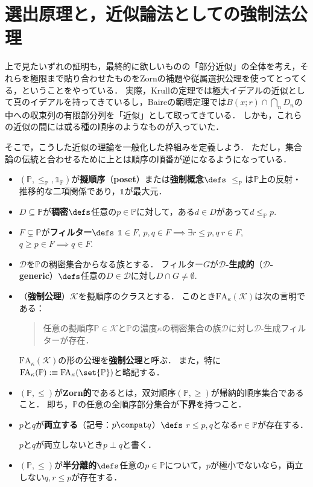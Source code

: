 \documentclass[a4j,leqno]{ltjsarticle}
\newcommand{\FA}{\mathrm{FA}}
\renewcommand{\emph}[1]{\textbf{\textsf{#1}}}
\begin{document}
\section{選出原理と，近似論法としての強制法公理}
上で見たいずれの証明も，最終的に欲しいものの「部分近似」の全体を考え，それらを極限まで貼り合わせたものをZornの補題や従属選択公理を使ってとってくる，ということをやっている．
実際，Krullの定理では極大イデアルの近似として真のイデアルを持ってきているし，Baireの範疇定理では$B(x; r) \cap \bigcap_n D_n$の中への収束列の有限部分列を「近似」として取ってきている．
しかも，これらの近似の間には或る種の順序のようなものが入っていた．

そこで，こうした近似の理論を一般化した枠組みを定義しよう．
ただし，集合論の伝統と合わせるために上とは順序の順番が逆になるようになっている．
\begin{definition}
 \begin{itemize}
  \item $(\mathbb{P}, {\leq}_{\mathbb{P}}, \mathds{1}_{\mathbb{P}})$が\emph{擬順序}（\emph{poset}）または\emph{強制概念}$\defs$ $\leq_{\mathbb{P}}$は$\mathbb{P}$上の反射・推移的な二項関係であり，$\mathds{1}$が最大元．
  \item $D \subseteq \mathbb{P}$が\emph{稠密}$\defs$任意の$p \in \mathbb{P}$に対して，ある$d \in D$があって$d \leq_{\mathbb{P}} p$.
  \item $F \subsetneq \mathbb{P}$が\emph{フィルター}$\defs$ $\mathds{1} \in F$, $p, q \in F \implies \exists r \leq p, q \: r \in F$, $q \geq p \in F \implies q \in F$.
  \item $\mathcal{D}$を$\mathbb{P}$の稠密集合からなる族とする．
        フィルター$G$が\emph{$\mathcal{D}$-生成的}（\emph{$\mathcal{D}$-generic}）$\defs$任意の$D \in \mathcal{D}$に対し$D \cap G \neq \emptyset$.
  \item （\emph{強制公理}）$\mathcal{K}$を擬順序のクラスとする．
        このとき$\FA_\kappa(\mathcal{K})$は次の言明である：

        \begin{quotation}
         任意の擬順序$\mathbb{P} \in \mathcal{K}$と$\mathbb{P}$の濃度$\kappa$の稠密集合の族$\mathcal{D}$に対し$\mathcal{D}$-生成フィルターが存在．
        \end{quotation}

        $\FA_\kappa(\mathcal{K})$の形の公理を\emph{強制公理}と呼ぶ．
        また，特に$\FA_\kappa(\mathbb{P}) \mathrel{{:}{\equiv}} \FA_\kappa(\set{\mathbb{P}})$と略記する．
  \item $(\mathbb{P}, \leq)$が\emph{Zorn的}であるとは，双対順序$(\mathbb{P}, \geq)$が帰納的順序集合であること．
        即ち，$\mathbb{P}$の任意の全順序部分集合が\emph{下界}を持つこと．
  \item $p$と$q$が\emph{両立する}（記号：$p \compat q$）$\defs$ $r \leq p, q$となる$r \in \mathbb{P}$が存在する．

        $p$と$q$が両立しないとき$p \perp q$と書く．
  \item $(\mathbb{P}, \leq)$が\emph{半分離的}$\defs$任意の$p \in \mathbb{P}$について，$p$が極小でないなら，両立しない$q, r \leq p$が存在する．
 \end{itemize}
\end{definition}
\end{document}
